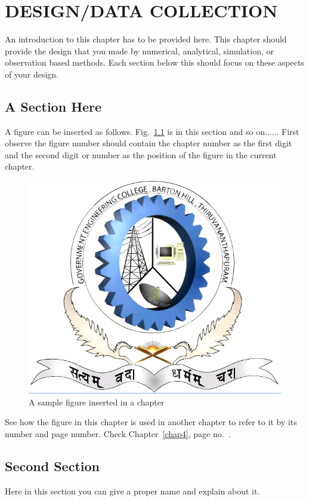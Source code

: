 \chapter{DESIGN/DATA COLLECTION}\label{chap3}
\thispagestyle{empty}

An introduction to this chapter has to be provided here. This chapter should provide the design that you made by numerical, analytical, simulation, or observation based methods. Each section below this should focus on these aspects of your design. 
\section{A Section Here}

A figure can be inserted as follows. Fig.~\ref{figureone} is in this section and so on...... First observe the figure number should contain the chapter number as the first digit and the second digit or number as the position of the figure in the current chapter.  

\begin{figure}[h!]
\centering
\includegraphics[width=0.4\linewidth]{./picture-files/gecb1}
\caption[A sample figure]{A sample figure inserted in a chapter}
\label{figureone}
\end{figure}

See how the figure in this chapter is used in another chapter to refer to it by its number and page number. Check Chapter~\ref{chap4}, page no.~\pageref{chap4}.

\section{Second Section}

Here in this section you can give a proper name and explain about it. 

